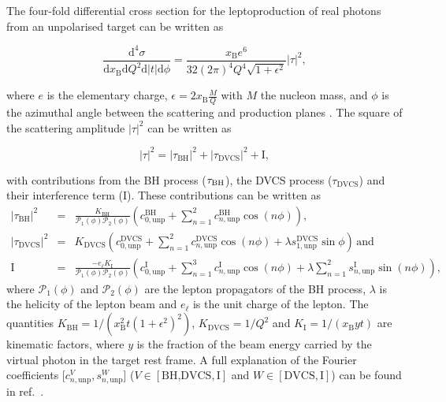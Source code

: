 The four-fold differential cross section for the leptoproduction of real photons
from an unpolarised target can be written as \cite{Bel02b}
\begin{center}
\begin{equation}
\frac{\textrm{d}^4\sigma}{\textrm{d}x_{\textrm{B}}\textrm{d}Q^{2}\textrm{d}
|t|\textrm{d}\phi} =
\frac{x_{\textrm{B}}e^{6}}{32(2\pi)^{4} Q^{4}\sqrt{1+\epsilon^{2}}}
|\tau|^{2},
\end{equation}
\end{center}
where $e$ is the elementary
charge, $\epsilon=2x_\textrm{B}\frac{M}{Q}$ with $M$
the nucleon mass, and $\phi$ is the
azimuthal angle between the scattering and production planes \cite{Tre04}.
The {square of the} scattering amplitude $|\tau|^2$ can be written as
\begin{center}
\begin{equation}
|\tau|^{2} = |\tau_{\textrm{BH}}|^{2} +
|\tau_{\textrm{DVCS}}|^{2} + \textrm{I},
\end{equation}
\end{center}
with contributions from the \textrm{BH} process ($\tau_{\textrm{\textrm{BH}}}$),
the DVCS process
($\tau_{\textrm{DVCS}}$) and their interference term (I). These
contributions can be written as
\begin{eqnarray}
 |\tau_{\textrm{BH}}|^{2} &=&
 \frac{K_{\textrm{BH}}}{\mathcal{P}_{1}(\phi)\mathcal{P}_{2}(\phi)} \left(c_{0,\textrm{unp}}^{\textrm{BH}} + \sum_{n=1}^2
  c_{n,\textrm{unp}}^{\textrm{BH}}\cos(n\phi)\right), \label{e:tbh}\\
|\tau_{\textrm{DVCS}}|^{2} &=&
K_{\textrm{DVCS}}\left(c_{0,\textrm{unp}}^{\textrm{DVCS}} +
\sum_{n=1}^2
c_{n,\textrm{unp}}^{\textrm{DVCS}}\cos(n\phi) + \lambda
s_{1,\textrm{unp}}^{\textrm{DVCS}}\sin\phi\right)\,\textrm{and}
\label{e:tdvcs}\\
 \textrm{I} &=& \frac{- e_\ell
K_{\textrm{I}}}{\mathcal{P}_{1}(\phi)\mathcal{P}_{2}(\phi)}\left(c_{0,\textrm{unp}}^{\textrm{
I}}+
\sum_{n=1}^3 c_{n,\textrm{unp}}^{\textrm{I}}\cos(n\phi) + \lambda \sum_{n=1}^2
s_{n,\textrm{unp}}^{\textrm{I}}\sin(n\phi)\right),\label{e:ti}
\end{eqnarray}
where $\mathcal{P}_1(\phi)$ and $\mathcal{P}_2(\phi)$ are the lepton propagators
of the BH process, $\lambda$ is the
helicity of the lepton beam and $e_\ell$ is the unit charge of
  the lepton.  The
quantities $K_{\textrm{BH}}=1/(x_\textrm{B}^2t(1+\epsilon^2)^2)$,
$K_{\textrm{DVCS}}=1/Q^2$
and $K_{\textrm{I}}=1/(x_{\textrm{B}}yt)$ are kinematic factors, where
$y$ is the fraction of the beam energy carried by the virtual photon in
the target rest frame. A full
explanation of the Fourier coefficients [$c_{n,\textrm{unp}}^V,s_{n,\textrm{unp}}^W$]
($V\in[\textrm{BH,DVCS},\textrm{I}]$ and $W\in[\textrm{DVCS},\textrm{I}]$) can be found in ref.~\cite{Bel02b}.
 
